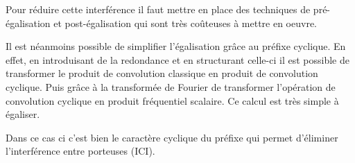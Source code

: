Pour réduire cette interférence il faut mettre en place des techniques de
pré-égalisation et post-égalisation qui sont très coûteuses à mettre en oeuvre.




Il est néanmoins possible de simplifier l'égalisation grâce au préfixe cyclique.
En effet, en introduisant de la redondance et en structurant celle-ci il est
possible de transformer le produit de convolution classique en produit de
convolution cyclique. Puis grâce à la transformée de Fourier de transformer
l'opération de convolution cyclique en produit fréquentiel scalaire. Ce calcul
est très simple à égaliser.

Dans ce cas ci c'est bien le caractère cyclique du préfixe qui permet d'éliminer
l'interférence entre porteuses (ICI).


